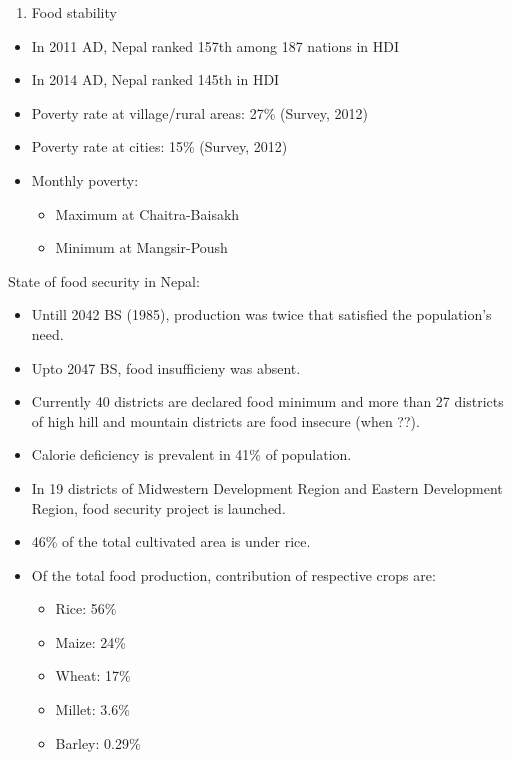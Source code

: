 \documentclass[
  openany]{book}
\providecommand{\tightlist}{%
  \setlength{\itemsep}{0pt}\setlength{\parskip}{0pt}}
\begin{document}
\begin{enumerate}
\def\labelenumi{\arabic{enumi}.}
\setcounter{enumi}{3}
\tightlist
\item
  Food stability
\end{enumerate}

\begin{itemize}
\tightlist
\item
  In 2011 AD, Nepal ranked 157th among 187 nations in HDI
\item
  In 2014 AD, Nepal ranked 145th in HDI
\item
  Poverty rate at village/rural areas: 27\% (Survey, 2012)
\item
  Poverty rate at cities: 15\% (Survey, 2012)
\item
  Monthly poverty:

  \begin{itemize}
  \tightlist
  \item
    Maximum at Chaitra-Baisakh
  \item
    Minimum at Mangsir-Poush
  \end{itemize}
\end{itemize}

State of food security in Nepal:

\begin{itemize}
\tightlist
\item
  Untill 2042 BS (1985), production was twice that satisfied the population's need.
\item
  Upto 2047 BS, food insufficieny was absent.
\item
  Currently 40 districts are declared food minimum and more than 27 districts of high hill and mountain districts are food insecure (when ??).
\item
  Calorie deficiency is prevalent in 41\% of population.
\item
  In 19 districts of Midwestern Development Region and Eastern Development Region, food security project is launched.
\item
  46\% of the total cultivated area is under rice.
\item
  Of the total food production, contribution of respective crops are:

  \begin{itemize}
  \tightlist
  \item
    Rice: 56\%
  \item
    Maize: 24\%
  \item
    Wheat: 17\%
  \item
    Millet: 3.6\%
  \item
    Barley: 0.29\%
  \end{itemize}
\end{itemize}
\end{document}
